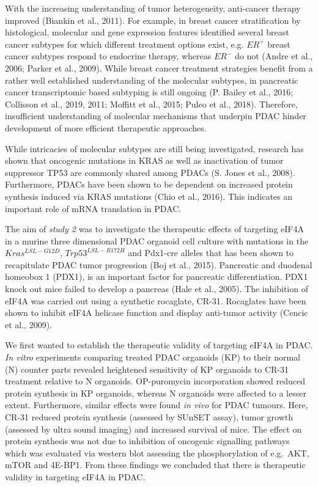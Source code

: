 \documentclass[12pt,openany]{book}
\begin{document}
With the increasing understanding of tumor heterogeneity, anti-cancer
therapy improved (Biankin et al., 2011). For example, in breast cancer
stratification by histological, molecular and gene expression features
identified several breast cancer subtypes for which different treatment
options exist, e.g. \(ER^+\) breast cancer subtypes respond to endocrine
therapy, whereas \(ER^-\) do not (Andre et al., 2006; Parker et al.,
2009). While breast cancer treatment strategies benefit from a rather
well established understanding of the molecular subtypes, in pancreatic
cancer transcriptomic based subtyping is still ongoing (P. Bailey et
al., 2016; Collisson et al., 2019, 2011; Moffitt et al., 2015; Puleo et
al., 2018). Therefore, insufficient understanding of molecular
mechanisms that underpin PDAC hinder development of more efficient
therapeutic approaches.

While intricacies of molecular subtypes are still being investigated,
research has shown that oncogenic mutations in KRAS as well as
inactivation of tumor suppressor TP53 are commonly shared among PDACs
(S. Jones et al., 2008). Furthermore, PDACs have been shown to be
dependent on increased protein synthesis induced via KRAS mutations
(Chio et al., 2016). This indicates an important role of mRNA
translation in PDAC.

The aim of \emph{study 2} was to investigate the therapeutic effects of
targeting eIF4A in a murine three dimensional PDAC organoid cell culture
with mutations in the \(Kras^{LSL-G12D}\), \(Trp53^{LSL-R172H}\) and
Pdx1-cre alleles that has been shown to recapitulate PDAC tumor
progression (Boj et al., 2015). Pancreatic and duodenal homeobox 1
(PDX1), is an important factor for pancreatic differentiation. PDX1
knock out mice failed to develop a pancreas (Hale et al., 2005). The
inhibition of eIF4A was carried out using a synthetic rocaglate, CR-31.
Rocaglates have been shown to inhibit eIF4A helicase function and
display anti-tumor activity (Cencic et al., 2009).

We first wanted to establish the therapeutic validity of targeting eIF4A
in PDAC. \emph{In vitro} experiments comparing treated PDAC organoids
(KP) to their normal (N) counter parts revealed heightened sensitivity
of KP organoids to CR-31 treatment relative to N organoids. OP-puromycin
incorporation showed reduced protein synthesis in KP organoids, whereas
N organoids were affected to a lesser extent. Furthermore, similar
effects were found \emph{in vivo} for PDAC tumours. Here, CR-31 reduced
protein synthesis (assessed by SUnSET assay), tumor growth (assessed by
ultra sound imaging) and increased survival of mice. The effect on
protein synthesis was not due to inhibition of oncogenic signalling
pathways which was evaluated via western blot assessing the
phosphorylation of e.g.~AKT, mTOR and 4E-BP1. From these findings we
concluded that there is therapeutic validity in targeting eIF4A in PDAC.
\end{document}
